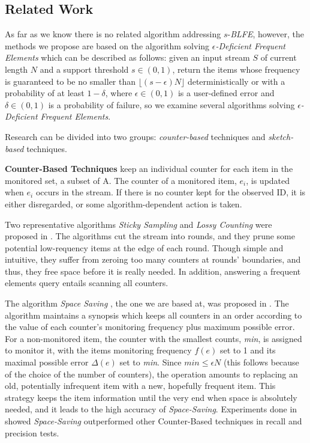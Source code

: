 \documentclass[conference]{IEEEtran}
\begin{document}
\subsection{Related Work}
As far as we know there is no related algorithm addressing $s$-\emph{BLFE}, however, the methods we propose are based on the algorithm solving $\epsilon$\emph{-Deficient Frequent Elements} which can be described as follows: given an input stream $S$ of current length $N$ and a support threshold $s\in(0,1)$, return the items whose frequency is guaranteed to be no smaller than $\lfloor(s-\epsilon)N\rfloor$ deterministically or with a probability of at least $1-\delta$, where $\epsilon\in(0,1)$ is a user-defined error and $\delta\in(0,1)$ is a probability of failure, so we examine several algorithms solving $\epsilon$\emph{-Deficient Frequent Elements}.\par
Research can be divided into two groups: \emph{counter-based} techniques and \emph{sketch-based} techniques.\par

\textbf{Counter-Based Techniques} keep an individual counter for each item in the monitored set, a subset of A. The counter of a monitored item, $e_i$, is updated when $e_i$ occurs in the stream. If there is no counter kept for the observed ID, it is either disregarded, or some algorithm-dependent action is taken.\par

Two representative algorithms \emph{Sticky Sampling} and \emph{Lossy Counting} were proposed in \cite{IEEEexample:sticky}. The algorithms cut the stream into rounds, and they prune some potential low-requency items at the edge of each round. Though simple and intuitive, they suffer from zeroing too many counters at rounds’ boundaries, and thus, they free space before it is really needed. In addition, answering a frequent elements query entails scanning all counters.\par

The algorithm \emph{Space Saving} , the one we are based at, was proposed in \cite{IEEEexample:spacesaving}. The algorithm maintains a synopsis which keeps all counters in an order according to the value of each counter's monitoring frequency plus maximum possible error. For a non-monitored item, the counter with the smallest counts, \emph{min}, is assigned to monitor it, with the items monitoring frequency $f(e)$ set to 1 and its maximal possible error $\Delta(e)$ set to \emph{min}. Since $min\leq\epsilon N$ (this follows because of the choice of the number of counters), the operation amounts to replacing an old, potentially infrequent item with a new, hopefully frequent item. This strategy keeps the item information until the very end when space is absolutely needed, and it leads to the high accuracy of \emph{Space-Saving}. Experiments done in \cite{IEEEexample:overview_vldbj,IEEEexample:overview} showed \emph{Space-Saving} outperformed other Counter-Based techniques in recall and precision tests.\par
\end{document}
